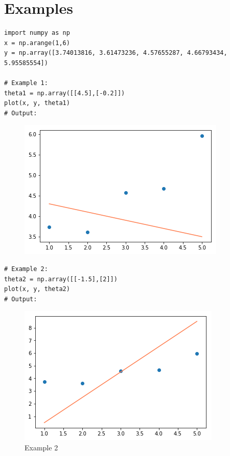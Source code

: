 \documentclass{42-en}
\begin{document}
\section*{Examples}

\begin{verbatim}
import numpy as np
x = np.arange(1,6)
y = np.array([3.74013816, 3.61473236, 4.57655287, 4.66793434, 5.95585554])

# Example 1:
theta1 = np.array([[4.5],[-0.2]])
plot(x, y, theta1)
# Output:
\end{verbatim}

\begin{figure}[H]
  \centering
  \includegraphics[scale=0.6]{assets/plot1.png}
\end{figure}

\newpage

\begin{verbatim}
# Example 2:
theta2 = np.array([[-1.5],[2]])
plot(x, y, theta2)
# Output:
\end{verbatim}

\begin{figure}[H]
  \centering
  \includegraphics[scale=0.6]{assets/plot2.png}
  \caption{Example 2}
\end{figure}
\end{document}
